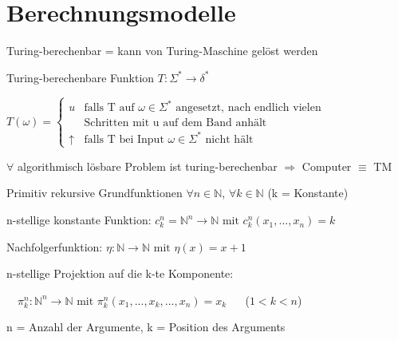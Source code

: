 \graphicspath{{images/}}

\section*{Berechnungsmodelle}

\begin{definition}{Turing-berechenbar} = kann von Turing-Maschine gelöst werden
    
    Turing-berechenbare Funktion $T: \Sigma^* \rightarrow \delta^*$

    $T(\omega) = \begin{cases}
        u & \text{falls T auf } \omega \in \Sigma^* \text{ angesetzt, nach endlich vielen}\\ 
        &\text{Schritten mit u auf dem Band anhält}\\
        \uparrow & \text{falls T bei Input } \omega \in \Sigma^* \text{ nicht hält}
    \end{cases}$
\end{definition}

\begin{remark}
    {\footnotesize
    $\forall$ algorithmisch lösbare Problem ist turing-berechenbar $\Rightarrow$ Computer $\equiv$ TM
    }
\end{remark}

\begin{theorem}{Primitiv rekursive Grundfunktionen} $\forall n \in \mathbb{N}$, $\forall k \in \mathbb{N}$ {\footnotesize (k = Konstante)}
    
    \vspace{1mm}

    n-stellige konstante Funktion: $c_k^n = \mathbb{N}^n \rightarrow \mathbb{N} \text{ mit } c_k^n (x_1, ... , x_n) = k$

    \vspace{1mm}

    Nachfolgerfunktion: $\eta : \mathbb{N} \rightarrow \mathbb{N} \text{ mit } \eta (x) = x + 1$

    \vspace{1mm}
    
    n-stellige Projektion auf die k-te Komponente: 

    \vspace{1mm}

    $\quad \pi_k^n : \mathbb{N}^n \rightarrow \mathbb{N} \text{ mit } \pi_k^n (x_1, ... ,x_k,..., x_n) = x_k$ {\footnotesize $\quad$ ($1 < k < n$)}
    
    {\small n = Anzahl der Argumente, k = Position des Arguments}
\end{theorem}

